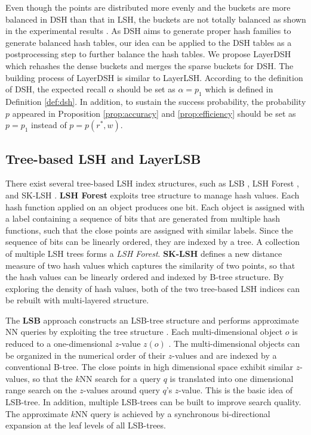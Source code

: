 Even though the points are distributed more evenly and the buckets are more balanced in DSH than that in LSH, the buckets are not totally balanced as shown in the experimental results \cite{Gao:2014:DDS:2588555.2588565}. As DSH aims to generate proper hash families to generate balanced hash tables, our idea can be applied to the DSH tables as a postprocessing step to further balance the hash tables. We propose LayerDSH which rehashes the dense buckets and merges the sparse buckets for DSH. The building process of LayerDSH is similar to LayerLSH. According to the definition of DSH, the expected recall $\alpha$ should be set as $\alpha=p_1$ which is defined in Definition \ref{def:dsh}. In addition, to sustain the success probability, the probability $p$ appeared in Proposition \ref{prop:accuracy} and \ref{prop:efficiency} should be set as $p=p_1$ instead of $p=p(r^*,w)$.


\subsection{Tree-based LSH and LayerLSB}

There exist several tree-based LSH index structures, such as LSB \cite{lsb}, LSH Forest \cite{Bawa:2005:LFS:1060745.1060840}, and SK-LSH \cite{sklsh}. \textbf{LSH Forest} \cite{Bawa:2005:LFS:1060745.1060840} exploits tree structure to manage hash values. Each hash function applied on an object produces one bit. Each object is assigned with a label containing a sequence of bits that are generated from multiple hash functions, such that the close points are assigned with similar labels. Since the sequence of bits can be linearly ordered, they are indexed by a tree. A collection of multiple LSH trees forms a \emph{LSH Forest}. \textbf{SK-LSH} \cite{sklsh} defines a new distance measure of two hash values which captures the similarity of two points, so that the hash values can be linearly ordered and indexed by B-tree structure. By exploring the density of hash values, both of the two tree-based LSH indices can be rebuilt with multi-layered structure.


The \textbf{LSB} approach constructs an LSB-tree structure and performs approximate NN queries by exploiting the tree structure \cite{lsb}. Each multi-dimensional object $o$ is reduced to a one-dimensional $z$-value $z(o)$ \cite{Gaede:1998:MAM:280277.280279}. The multi-dimensional objects can be organized in the numerical order of their $z$-values and are indexed by a conventional B-tree. The close points in high dimensional space exhibit similar $z$-values, so that the $k$NN search for a query $q$ is translated into one dimensional range search on the $z$-values around query $q$'s $z$-value. This is the basic idea of LSB-tree. In addition, multiple LSB-trees can be built to improve search quality. The approximate $k$NN query is achieved by a synchronous bi-directional expansion at the leaf levels of all LSB-trees.


